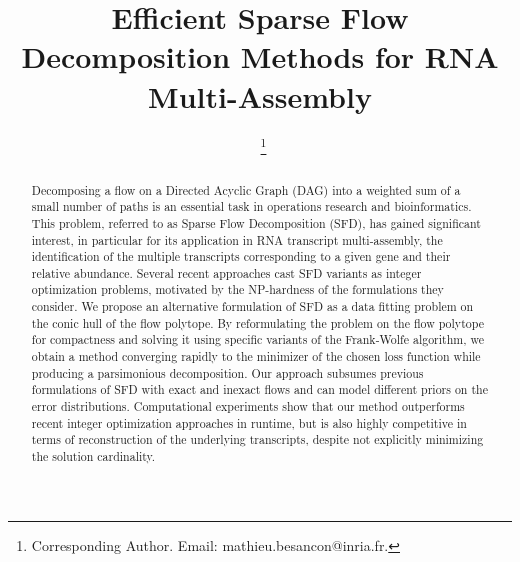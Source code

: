 \documentclass{ecai}
\begin{document}

\begin{frontmatter}




\title{Efficient Sparse Flow Decomposition Methods for {RNA} Multi-Assembly}


\author[A]{~\thanks{Corresponding Author. Email: mathieu.besancon@inria.fr.}}

\address[A]{Université Grenoble Alpes, Inria, LIG, CNRS}


\begin{abstract}
Decomposing a flow on a Directed Acyclic Graph (DAG) into a weighted sum of a small number of paths is an essential task in operations research and bioinformatics.
This problem, referred to as Sparse Flow Decomposition (SFD), has gained significant interest, in particular for its application in RNA transcript multi-assembly, the identification of the multiple transcripts corresponding to a given gene and their relative abundance.
Several recent approaches cast SFD variants as integer optimization problems, motivated by the NP-hardness of the formulations they consider. We propose an alternative formulation of SFD as a data fitting problem on the conic hull of the flow polytope.
By reformulating the problem on the flow polytope for compactness and solving it using specific variants of the Frank-Wolfe algorithm,
we obtain a method converging rapidly to the minimizer of the chosen loss function while producing a parsimonious decomposition.
Our approach subsumes previous formulations of SFD with exact and inexact flows and can model different priors on the error distributions.
Computational experiments show that our method outperforms recent integer optimization approaches in runtime, but is also highly competitive in terms of reconstruction of the underlying transcripts, despite not explicitly minimizing the solution cardinality.
\end{abstract}
    
\end{frontmatter}
\end{document}
